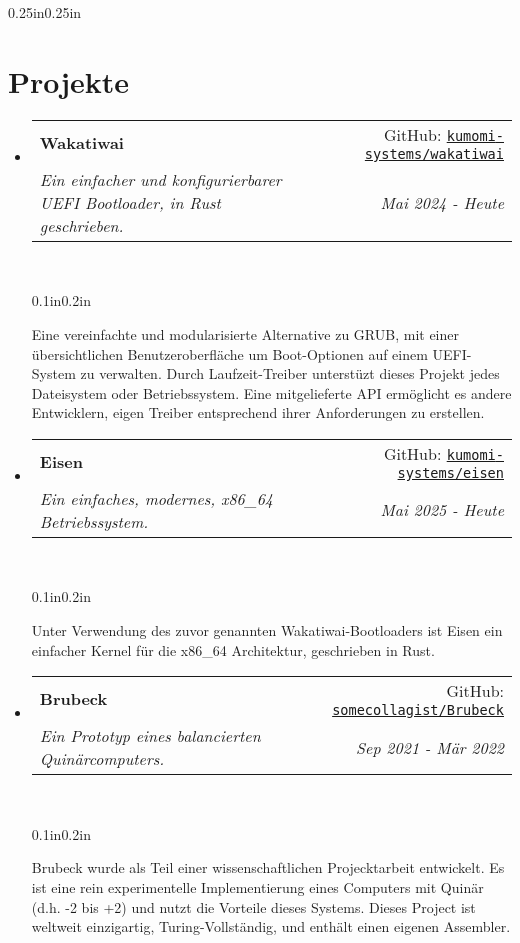 \documentclass[a4paper]{article}
\makeatletter
\newcommand{\resumeSubheading}[5][]{
  \vspace{2pt}\item
    \begin{tabular*}{0.875\textwidth}[t]{l@{\extracolsep{\fill}}r}
      \textbf{#2} & #3 \\
      \textit{\small#4} & \textit{\small #5} \\
    \end{tabular*}\\
    \vspace{-5pt}
    \begin{adjustwidth}{0.1in}{0.2in}
      #1
    \end{adjustwidth}
    \vspace{10pt}
}
\newcommand{\resumeSubheadingList}[1]{
  \begin{itemize}
    #1
  \end{itemize}
}
\makeatother
\begin{document}
\begin{adjustwidth}{0.25in}{0.25in}
  \section{Projekte}
    \resumeSubheadingList{
      \resumeSubheading[
        Eine vereinfachte und modularisierte Alternative zu GRUB, mit einer
        übersichtlichen Benutzeroberfläche um Boot-Optionen auf einem
        UEFI-System zu verwalten. Durch Laufzeit-Treiber unterstüzt dieses
        Projekt jedes Dateisystem oder Betriebssystem. Eine mitgelieferte
        API ermöglicht es andere Entwicklern, eigen Treiber entsprechend
        ihrer Anforderungen zu erstellen.
      ]
        {Wakatiwai}
        {GitHub: \href{https://github.com/kumomi-systems/wakatiwai}
          {\texttt{kumomi{-}systems/wakatiwai}}}
        {Ein einfacher und konfigurierbarer UEFI Bootloader, in Rust
          geschrieben.}
        {Mai 2024 {-} Heute}
      \resumeSubheading[
        Unter Verwendung des zuvor genannten Wakatiwai-Bootloaders ist Eisen
        ein einfacher Kernel für die x86\_64 Architektur, geschrieben in Rust.
      ]
        {Eisen}
        {GitHub: \href{https://github.com/kumomi-systems/eisen}
          {\texttt{kumomi{-}systems/eisen}}}
        {Ein einfaches, modernes, x86\_64 Betriebssystem.}
        {Mai 2025 {-} Heute}
      \resumeSubheading[
        Brubeck wurde als Teil einer wissenschaftlichen Projecktarbeit
        entwickelt. Es ist eine rein experimentelle Implementierung eines
        Computers mit Quinär (d.h. {-}2 bis +2) und nutzt die Vorteile dieses
        Systems. Dieses Project ist weltweit einzigartig, Turing-Vollständig,
        und enthält einen eigenen Assembler.
      ]
        {Brubeck}
        {GitHub: \href{https://github.com/somecollagist/Brubeck}
          {\texttt{somecollagist/Brubeck}}}
        {Ein Prototyp eines balancierten Quinärcomputers.}
        {Sep 2021 {-} Mär 2022}
    }


\end{adjustwidth}
\end{document}
